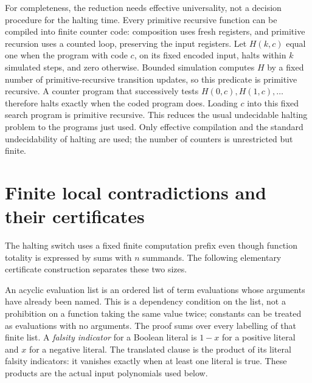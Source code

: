 For completeness, the reduction needs effective universality, not a
decision procedure for the halting time. Every primitive recursive function
can be compiled into finite counter code: composition uses fresh registers,
and primitive recursion uses a counted loop, preserving the input registers.
Let $H(k,c)$ equal one when the program with code $c$, on its fixed
encoded input, halts within $k$ simulated steps, and zero otherwise.
Bounded simulation computes $H$ by a fixed number of primitive-recursive
transition updates, so this predicate is primitive recursive. A counter program that successively tests
$H(0,c),H(1,c),\ldots$ therefore halts exactly when the coded program does.
Loading $c$ into this fixed search program is primitive recursive. This
reduces the usual undecidable halting problem to the programs just used.
Only effective compilation and the standard undecidability of halting are used; the number of counters is unrestricted but finite.

\section{Finite local contradictions and their certificates}
\label{tx:app:finite-certificate}
The halting switch uses a fixed finite computation prefix even though
function totality is expressed by sums with $n$ summands. The following
elementary certificate construction separates these two sizes.

An acyclic evaluation list is an ordered list of term evaluations
whose arguments have already been named. This is a dependency condition
on the list, not a prohibition on a function taking the same value twice;
constants can be treated as evaluations with no arguments. The proof
sums over every labelling of that finite list. A \emph{falsity indicator}
for a Boolean literal is $1-x$ for a positive literal and $x$ for a
negative literal. The translated clause is the product of its literal
falsity indicators: it vanishes exactly when at least one literal is
true. These products are the actual input polynomials used below.

